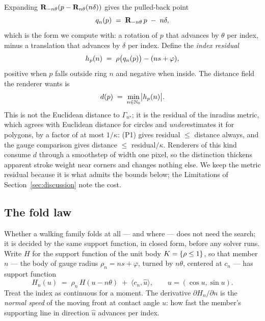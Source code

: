 Expanding $\mathbf{R}_{-n\theta}(p - \mathbf{R}_{n\theta}(n\delta))$ gives the pulled-back
point
\begin{equation}
  q_n(p) \;=\; \mathbf{R}_{-n\theta}\,p \;-\; n\delta,
  \label{eq:qn}
\end{equation}
which is the form we compute with: a rotation of $p$ that advances by $\theta$ per
index, minus a translation that advances by $\delta$ per index. Define the
\emph{index residual}
\begin{equation}
  h_p(n) \;=\; \rho\bigl(q_n(p)\bigr) - (ns + \varphi),
  \label{eq:residual}
\end{equation}
positive when $p$ falls outside ring $n$ and negative when inside. The distance
field the renderer wants is
\begin{equation}
  d(p) \;=\; \min_{n\in\mathbb{N}_0} \bigl|h_p(n)\bigr|.
  \label{eq:field}
\end{equation}
This is not the Euclidean distance to $\Gamma_{n^\star}$; it is the residual of
the inradius metric, which agrees with Euclidean distance for circles and
\emph{under}estimates it for polygons, by a factor of at most $1/\kappa$:
(P1) gives residual $\le$ distance always, and the gauge comparison gives
distance $\le$ residual$/\kappa$. Renderers of this kind consume $d$ through a
smoothstep of width one pixel, so the distinction thickens apparent stroke
weight near corners and changes nothing else. We keep the metric residual
because it is what admits the bounds below; the Limitations of
Section~\ref{sec:discussion} note the cost.

\subsection{The fold law}
\label{sec:foldlaw}

Whether a walking family folds at all --- and where --- does not need the
search; it is decided by the same support function, in closed form, before any
solver runs. Write $H$ for the support function of the unit body
$K=\{\rho\le1\}$, so that member $n$ --- the body of gauge radius
$\rho_n=ns+\varphi$, turned by $n\theta$, centered at $c_n$ --- has support
function
\begin{equation}
  H_n(u) \;=\; \rho_n\,H(u-n\theta)\;+\;\langle c_n,\hat u\rangle,
  \qquad \hat u=(\cos u,\sin u).
  \label{eq:famsupport}
\end{equation}
Treat the index as continuous for a moment. The derivative
$\partial H_n/\partial n$ is the \emph{normal speed} of the moving front at
contact angle $u$: how fast the member's supporting line in direction $\hat u$
advances per index.

